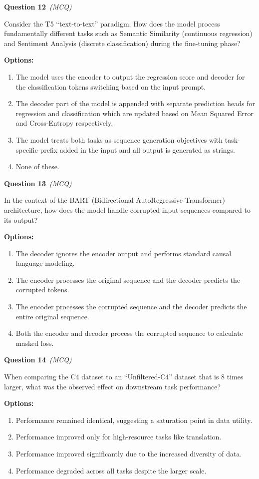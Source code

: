 \documentclass[11pt]{article}
\newcommand{\q}[2]{\vspace{0.5em}\noindent\textbf{Question #1}\if\relax\detokenize{#2}\relax\else\ \textit{(#2)}\fi\par}
\newcommand{\opts}{\textbf{Options:}}
\begin{document}
\q{12}{MCQ}
Consider the T5 ``text-to-text'' paradigm. How does the model process fundamentally different tasks such as Semantic Similarity (continuous regression) and Sentiment Analysis (discrete classification) during the fine-tuning phase?

\opts
\begin{enumerate}[label=(\alph*)]
\item The model uses the encoder to output the regression score and decoder for the classification tokens switching based on the input prompt.
\item The decoder part of the model is appended with separate prediction heads for regression and classification which are updated based on Mean Squared Error and Cross-Entropy respectively.
\item The model treats both tasks as sequence generation objectives with task-specific prefix added in the input and all output is generated as strings.
\item None of these.
\end{enumerate}

\q{13}{MCQ}
In the context of the BART (Bidirectional AutoRegressive Transformer) architecture, how does the model handle corrupted input sequences compared to its output?

\opts
\begin{enumerate}[label=(\alph*)]
\item The decoder ignores the encoder output and performs standard causal language modeling.
\item The encoder processes the original sequence and the decoder predicts the corrupted tokens.
\item The encoder processes the corrupted sequence and the decoder predicts the entire original sequence.
\item Both the encoder and decoder process the corrupted sequence to calculate masked loss.
\end{enumerate}

\q{14}{MCQ}
When comparing the C4 dataset to an ``Unfiltered-C4'' dataset that is 8 times larger, what was the observed effect on downstream task performance?

\opts
\begin{enumerate}[label=(\alph*)]
\item Performance remained identical, suggesting a saturation point in data utility.
\item Performance improved only for high-resource tasks like translation.
\item Performance improved significantly due to the increased diversity of data.
\item Performance degraded across all tasks despite the larger scale.
\end{enumerate}
\end{document}
